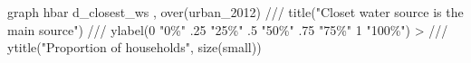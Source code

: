 graph hbar d_closest_ws , over(urban_2012) ///
        title("Closet water source is the main source") ///
        ylabel(0 "0\%" .25 "25\%" .5 "50\%" .75 "75\%" 1 "100\%") 
> ///
        ytitle("Proportion of households", size(small))
